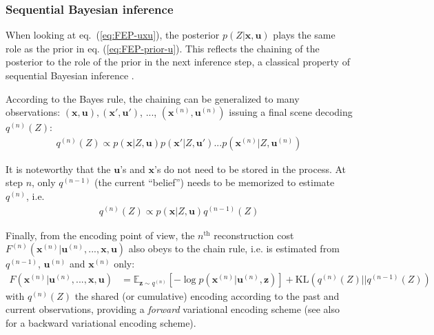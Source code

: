 \documentclass[12pt,twoside,openright]{article}
\begin{document}
\subsubsection{Sequential Bayesian inference}
When looking at eq.~(\ref{eq:FEP-uxu}), the posterior $p(Z|\boldsymbol{x},\boldsymbol{u})$ plays the same role as the prior in eq. (\ref{eq:FEP-prior-u}). This reflects the chaining of the posterior to the role of the prior in the next inference step, a classical property of sequential Bayesian inference \cite{wald1945sequential}.

According to the Bayes rule, the chaining can be generalized to many observations: $(\boldsymbol{x},\boldsymbol{u}), (\boldsymbol{x}',\boldsymbol{u}')$, ..., $(\boldsymbol{x}^{(n)},\boldsymbol{u}^{(n)})$ issuing a final scene decoding $q^{(n)}(Z)$:
\begin{align}
q^{(n)}(Z) \propto p(\boldsymbol{x}|Z,\boldsymbol{u}) p(\boldsymbol{x}'|Z,\boldsymbol{u}') ... p(\boldsymbol{x}^{(n)}|Z,\boldsymbol{u}^{(n)}) \label{eq:accum}
\end{align}
 
It is noteworthy that the $\boldsymbol{u}$'s and $\boldsymbol{x}$'s do not need to be stored in the process. At step $n$, only $q^{(n-1)}$ (the current ``belief'') needs to be memorized to estimate $q^{(n)}$, i.e. 
\begin{align} 
q^{(n)}(Z) \propto p(\boldsymbol{x}|Z,\boldsymbol{u}) q^{(n-1)}(Z) \label{eq:accum-post}
\end{align}

Finally, from the encoding point of view, the $n^\text{th}$ reconstruction cost $F^{(n)}(\boldsymbol{x}^{(n)}|\boldsymbol{u}^{(n)}, ..., \boldsymbol{x}, \boldsymbol{u})$ also obeys to the chain rule, i.e. is estimated from $q^{(n-1)}$, $\boldsymbol{u}^{(n)}$ and $\boldsymbol{x}^{(n)}$ only:
\begin{align}
F(\boldsymbol{x}^{(n)}|\boldsymbol{u}^{(n)}, ...,  \boldsymbol{x}, \boldsymbol{u}) 
&= \mathbb{E}_{\boldsymbol{z} \sim q^{(n)}} \left[-\log p(\boldsymbol{x}^{(n)}| \boldsymbol{u}^{(n)}, \boldsymbol{z})\right] + \text{KL}(q^{(n)}(Z)||q^{(n-1)}(Z))
\label{eq:FEP-uxun}
\end{align}
with $q^{(n)}(Z)$ the shared (or cumulative) encoding according to the past and current observations, providing a \emph{forward} variational encoding scheme (see also \cite{fraccaro2016sequential} for a backward variational encoding scheme). 
\end{document}
